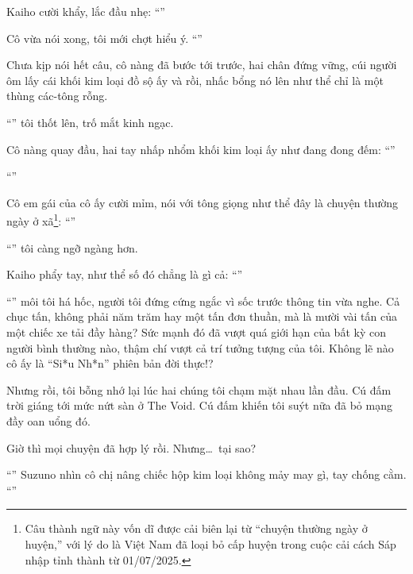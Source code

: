 \documentclass[../main.tex]{subfiles}
\begin{document}
Kaiho cười khẩy, lắc đầu nhẹ: ``''

Cô vừa nói xong, tôi mới chợt hiểu ý. ``''

Chưa kịp nói hết câu, cô nàng đã bước tới trước, hai chân đứng vững, cúi người ôm lấy cái khối kim loại đồ sộ ấy và rồi, nhấc bổng nó lên như thể chỉ là một thùng các-tông rỗng.

``'' tôi thốt lên, trố mắt kinh ngạc.

Cô nàng quay đầu, hai tay nhấp nhổm khối kim loại ấy như đang đong đếm: ``''

``''

Cô em gái của cô ấy cười mỉm, nói với tông giọng như thể đây là chuyện thường ngày ở xã\footnote{Câu thành ngữ này vốn dĩ được cải biên lại từ ``chuyện thường ngày ở huyện,'' với lý do là Việt Nam đã loại bỏ cấp huyện trong cuộc cải cách Sáp nhập tỉnh thành từ 01/07/2025.}: ``''

``'' tôi càng ngỡ ngàng hơn.

Kaiho phẩy tay, như thể số đó chẳng là gì cả: ``''

``'' môi tôi há hốc, người tôi đứng cứng ngắc vì sốc trước thông tin vừa nghe. Cả chục tấn, không phải năm trăm hay một tấn đơn thuần, mà là mười vài tấn của một chiếc xe tải đầy hàng? Sức mạnh đó đã vượt quá giới hạn của bất kỳ con người bình thường nào, thậm chí vượt cả trí tưởng tượng của tôi. Không lẽ nào cô ấy là ``Si*u Nh*n'' phiên bản đời thực!?

Nhưng rồi, tôi bỗng nhớ lại lúc hai chúng tôi chạm mặt nhau lần đầu. Cú đấm trời giáng tới mức nứt sàn ở The Void. Cú đấm khiến tôi suýt nữa đã bỏ mạng đầy oan uổng đó.

Giờ thì mọi chuyện đã hợp lý rồi. Nhưng\dots\ tại sao?

``'' Suzuno nhìn cô chị nâng chiếc hộp kim loại không mảy may gì, tay chống cằm. ``''
\end{document}
